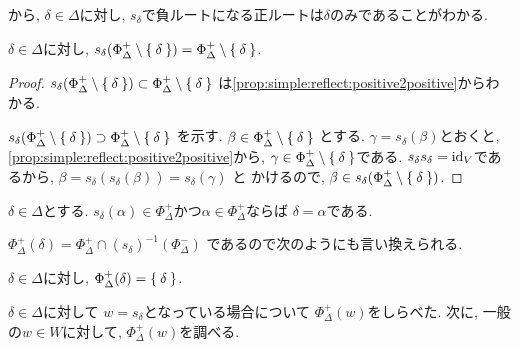 から,
$\delta\in\Delta$に対し,
$s_\delta$で負ルートになる正ルートは$\delta$のみであることがわかる.
\begin{cor}
  $\delta\in\Delta$に対し,
  $s_\delta(\Phi_\Delta^+\setminus\Set{\delta})=\Phi_\Delta^+\setminus\Set{\delta}$.
\end{cor}
\begin{proof}
$s_\delta(\Phi_\Delta^+\setminus\Set{\delta})\subset\Phi_\Delta^+\setminus\Set{\delta}$
は\cref{prop:simple:reflect:positive2positive}からわかる.

$s_\delta(\Phi_\Delta^+\setminus\Set{\delta})\supset\Phi_\Delta^+\setminus\Set{\delta}$
を示す.
$\beta\in\Phi_\Delta^+\setminus\Set{\delta}$
とする.
$\gamma=s_\delta(\beta)$とおくと,
\cref{prop:simple:reflect:positive2positive}から,
$\gamma\in \Phi_\Delta^+\setminus\Set{\delta}$である.
$s_\delta s_\delta=\operatorname{id}_V$であるから,
$\beta=s_\delta(s_\delta(\beta))=s_\delta(\gamma)$
と
かけるので, $\beta\in s_\delta(\Phi_\Delta^+\setminus\Set{\delta})$.
\end{proof}
\begin{cor}
  \label{thm:simple:action:x}
  $\delta\in\Delta$とする.
  $s_\delta(\alpha)\in\Phi_\Delta^+$かつ$\alpha\in\Phi_\Delta^+$ならば
  $\delta=\alpha$である.
\end{cor}
$\Phi_\Delta^{+}(\delta)=\Phi_\Delta^+\cap (s_\delta)^{-1}(\Phi_\Delta^-)$
であるので次のようにも言い換えられる.
\begin{cor}
  $\delta\in\Delta$に対し,
  $\Phi_\Delta^{+}(\delta)=\Set{\delta}$.
\end{cor}

$\delta\in\Delta$に対して
$w=s_\delta$となっている場合について $\Phi_\Delta^+(w)$をしらべた.
次に, 一般の$w\in W$に対して,
$\Phi_\Delta^+(w)$を調べる.

